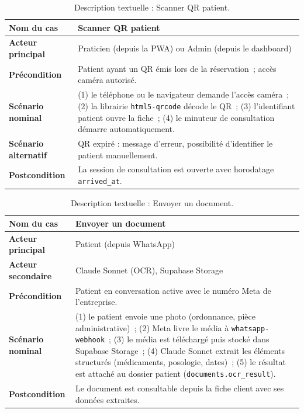 \begin{table}[H]
  \centering\small
  \caption{Description textuelle : Scanner QR patient.}
  \label{tab:uc-s2-qr}
  \renewcommand{\arraystretch}{1.45}
  \begin{tabular}{|p{3.0cm}|>{\raggedright\arraybackslash}p{10.8cm}|}
    \hline\hline
    \textbf{Nom du cas} & Scanner QR patient \\
    \hline
    \textbf{Acteur principal} & Praticien (depuis la PWA) ou Admin
      (depuis le dashboard) \\
      \hline
    \textbf{Précondition} & Patient ayant un QR émis lors de la
      réservation~; accès caméra autorisé. \\
      \hline
    \textbf{Scénario nominal} &
      (1) le téléphone ou le navigateur demande l'accès caméra~;
      (2) la librairie \texttt{html5-qrcode} décode le QR~;
      (3) l'identifiant patient ouvre la fiche~;
      (4) le minuteur de consultation démarre automatiquement. \\
      \hline
    \textbf{Scénario alternatif} & QR expiré : message d'erreur,
      possibilité d'identifier le patient manuellement. \\
      \hline
    \textbf{Postcondition} & La session de consultation est ouverte
      avec horodatage \texttt{arrived\_at}. \\
    \hline\hline
  \end{tabular}
\end{table}

\begin{table}[H]
  \centering\small
  \caption{Description textuelle : Envoyer un document.}
  \label{tab:uc-s2-doc}
  \renewcommand{\arraystretch}{1.45}
  \begin{tabular}{|p{3.0cm}|>{\raggedright\arraybackslash}p{10.8cm}|}
    \hline\hline
    \textbf{Nom du cas} & Envoyer un document \\
    \hline
    \textbf{Acteur principal} & Patient (depuis WhatsApp) \\
    \hline
    \textbf{Acteur secondaire} & Claude Sonnet (OCR), Supabase Storage \\
    \hline
    \textbf{Précondition} & Patient en conversation active avec le
      numéro Meta de l'entreprise. \\
      \hline
    \textbf{Scénario nominal} &
      (1) le patient envoie une photo (ordonnance, pièce administrative)~;
      (2) Meta livre le média à \texttt{whatsapp-webhook}~;
      (3) le média est téléchargé puis stocké dans Supabase Storage~;
      (4) Claude Sonnet extrait les éléments structurés
          (médicaments, posologie, dates)~;
      (5) le résultat est attaché au dossier patient
          (\texttt{documents.ocr\_result}). \\
          \hline
    \textbf{Postcondition} & Le document est consultable depuis la
      fiche client avec ses données extraites. \\
    \hline\hline
  \end{tabular}
\end{table}

